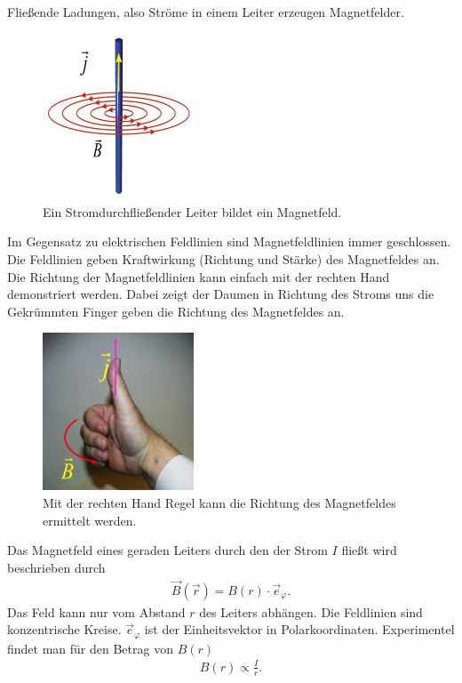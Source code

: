 \documentclass{scrartcl}
\begin{document}
\noindent Fließende Ladungen, also Ströme in einem Leiter erzeugen Magnetfelder.
\begin{figure}[H]
    \centering
    \includegraphics[width=0.4\textwidth]{Magnetfeld.png}
    \caption{Ein Stromdurchfließender Leiter bildet ein Magnetfeld.}
\end{figure}
\noindent Im Gegensatz zu elektrischen Feldlinien sind Magnetfeldlinien immer geschlossen.
Die Feldlinien geben Kraftwirkung (Richtung und Stärke) des Magnetfeldes an.
Die Richtung der Magnetfeldlinien kann einfach mit der rechten Hand demonstriert werden.
Dabei zeigt der Daumen in Richtung des Stroms uns die Gekrümmten Finger geben die Richtung des Magnetfeldes an.
\begin{figure}[H]
    \centering
    \includegraphics[width=0.4\textwidth]{rechte Hand.png}
    \caption{Mit der rechten Hand Regel kann die Richtung des Magnetfeldes ermittelt werden.}
\end{figure}
Das Magnetfeld eines geraden Leiters durch den der Strom $I$ fließt wird beschrieben durch
\begin{align}
    \vec{B}(\vec{r})=B(r)\cdot \vec{e}_\varphi.
\end{align}
Das Feld kann nur vom Abstand $r$ des Leiters abhängen. Die Feldlinien sind konzentrische Kreise.
$\vec{e}_\varphi$ ist der Einheitsvektor in Polarkoordinaten. Experimentel findet man für den 
Betrag von $B(r)$
\begin{align}
    B(r)\propto \frac{I}{r}.
\end{align}
\end{document}
